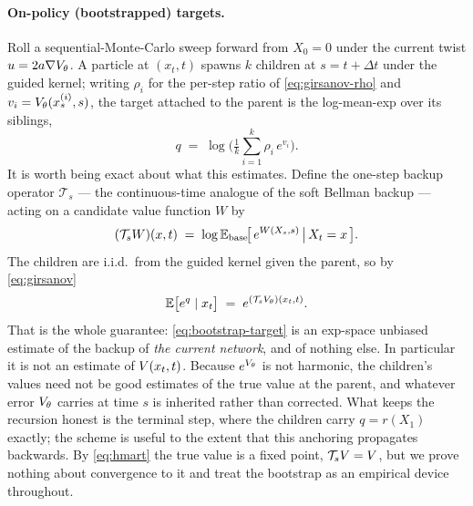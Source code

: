 \paragraph{On-policy (bootstrapped) targets.}
Roll a sequential-Monte-Carlo sweep forward from $X_0=0$ under the current
twist $u=2a\nabla V_\theta$. A particle at $(x_t,t)$ spawns $k$ children at
$s=t+\Delta t$ under the guided kernel; writing $\rho_i$ for the per-step ratio
of \eqref{eq:girsanov-rho} and $v_i = V_\theta(x^{(i)}_s, s)$, the target
attached to the parent is the log-mean-exp over its siblings,
\begin{equation}
  q \;=\; \log\Big(\tfrac{1}{k}\textstyle\sum_{i=1}^{k}\rho_i\,e^{v_i}\Big).
  \label{eq:bootstrap-target}
\end{equation}
It is worth being exact about what this estimates. Define the one-step backup
operator $\mathcal{T}_s$ --- the continuous-time analogue of the soft Bellman
backup \citep{haarnoja2017softq} --- acting on a candidate value function $W$ by
\begin{equation}
  (\mathcal{T}_s W)(x,t) \;=\; \log\mathbb{E}_{\mathrm{base}}\!\big[\,e^{W(X_s,s)}\,\big|\,X_t=x\,\big].
  \label{eq:backup-op}
\end{equation}
The children are i.i.d.\ from the guided kernel given the parent, so by
\eqref{eq:girsanov}
\begin{equation}
  \mathbb{E}\big[e^{q}\mid x_t\big] \;=\; e^{(\mathcal{T}_s V_\theta)(x_t,t)}.
  \label{eq:backup-unbiased}
\end{equation}
That is the whole guarantee: \eqref{eq:bootstrap-target} is an exp-space
unbiased estimate of the backup of \emph{the current network}, and of nothing
else. In particular it is not an estimate of $V(x_t,t)$. Because
$e^{V_\theta}$ is not harmonic, the children's values need not be good
estimates of the true value at the parent, and whatever error $V_\theta$
carries at time $s$ is inherited rather than corrected. What keeps the
recursion honest is the terminal step, where the children carry $q=r(X_1)$
exactly; the scheme is useful to the extent that this anchoring propagates
backwards. By \eqref{eq:hmart} the true value is a fixed point,
$\mathcal{T}_sV=V$, but we prove nothing about convergence to it and treat
the bootstrap as an empirical device throughout.

